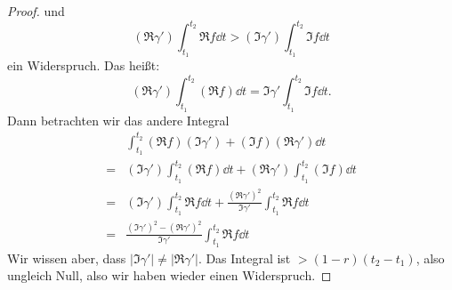 \begin{proof}
und
\[
(\Re\gamma')\int_{t_1}^{t_2}\Re f\dd{t}> (\Im\gamma')\int_{t_1}^{t_2}\Im f\dd{t}
\]
ein Widerspruch.
	Das heißt:
	\[
	(\Re \gamma')\int_{t_1}^{t_2}(\Re f)\dd{t} =\Im\gamma' \int_{t_1}^{t_2} \Im f\dd{t}
	.\] 
	Dann betrachten wir das andere Integral
	\begin{align*}
		&\int_{t_1}^{t_2} (\Re f)(\Im \gamma')+(\Im f)(\Re \gamma')\dd{t}\\
		=&(\Im\gamma')\int_{t_1}^{t_2} (\Re f)\dd{t} +(\Re\gamma')\int_{t_1}^{t_2}(\Im f)\dd{t}\\
		=&(\Im \gamma')\int_{t_1}^{t_2}\Re f\dd{t}+\frac{(\Re \gamma')^2}{\Im\gamma'}\int_{t_1}^{t_2}\Re f\dd{t}\\
		=&\frac{(\Im\gamma')^2-(\Re\gamma')^2}{\Im\gamma'}\int_{t_1}^{t_2}\Re f\dd{t}
	\end{align*}
	Wir wissen aber, dass $|\Im\gamma'|\neq |\Re\gamma'|$. Das Integral ist $>(1-r)(t_2-t_1)$, also ungleich Null, also wir haben wieder einen Widerspruch.
\end{proof}
